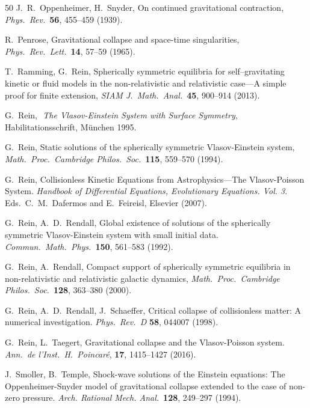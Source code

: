 \documentclass[11pt]{article}
\begin{document}
\begin{thebibliography}{50}
  {\sc J.~R.~Oppenheimer, H.~Snyder},
  On continued gravitational contraction,
  {\em Phys.\ Rev.}\ {\bf 56}, 455--459 (1939).

  {\sc R.~Penrose},
  Gravitational collapse and space-time singularities,
  {\em Phys.\ Rev.\ Lett.}\ {\bf 14}, 57--59 (1965).

  {\sc T.~Ramming, G.~Rein},
  Spherically symmetric equilibria for self--grav\-itating
  kinetic or fluid models in the non-relativistic and
  relativistic case---A simple proof for finite extension,
  {\em SIAM J.\ Math.\ Anal.}\ 
  {\bf 45}, 900--914 (2013).

  {\sc G.~Rein},
  {\em\,\,The Vlasov-Einstein System with Surface Symmetry},
  Habilitationsschrift, M\"unchen 1995.

  {\sc G.~Rein},
  Static solutions of the spherically symmetric Vlasov-Einstein system,
  {\em Math.\ Proc.\ Cambridge Philos.\ Soc.}\ 
  {\bf 115}, 559--570 (1994).
  
  {\sc G.~Rein},
  Collisionless Kinetic Equations from Astrophysics---The Vla\-sov-Poisson
  System.
  {\em Handbook of Differential Equations, Evolutionary Equations. Vol. 3}. 
  Eds.\ C.~M.~Dafermos and E.~Feireisl, Elsevier (2007).

  {\sc G.~Rein, A.~D.~Rendall}, 
  Global existence of solutions of the spherically symmetric
  Vlasov-Einstein system with small initial data.
  {\em Commun.\ Math.\ Phys.}\ 
  {\bf 150}, 561--583 (1992).

  {\sc G.~Rein, A.~Rendall},
  Compact support of spherically symmetric equilibria in
  non-relativistic and relativistic galactic dynamics,
  {\em Math.\ Proc.\ Cambridge Philos.\ Soc.}\ 
  {\bf 128}, 363--380 (2000).
  
\bibitem{RRS}
  {\sc G.~Rein, A.~D.~Rendall, J.~Schaeffer},
  Critical collapse of collisionless matter: A numerical investigation.
  {\em Phys.\ Rev.\ D} 
  {\bf 58}, 044007 (1998).
  
\bibitem{RT}
 {\sc G.~Rein, L.~Taegert},
 Gravitational collapse and the Vlasov-Poisson system.
 {\em Ann.\ de l'Inst.\ H.\ Poincar\'e},
 {\bf 17}, 1415--1427 (2016).
 
\bibitem{ST94}
  {\sc J.~Smoller, B.~Temple},
  Shock-wave solutions of the Einstein equations:
  The Oppenheimer-Snyder model of
  gravitational collapse extended to the case of
  non-zero pressure.
  {\em Arch. Rational Mech. Anal.}\
  {\bf 128}, 249--297 (1994).
  
\end{thebibliography}
\end{document}
